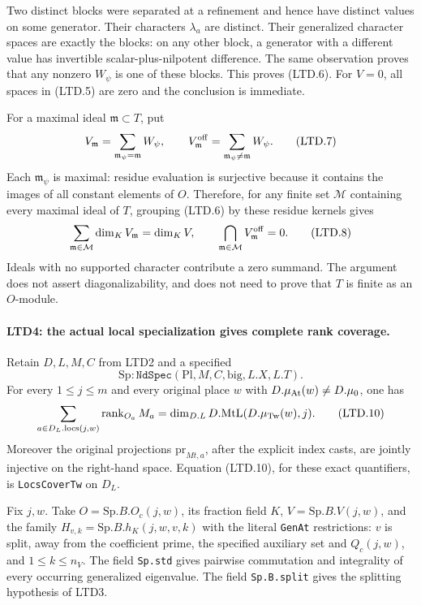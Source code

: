 Two distinct blocks were separated at a refinement and hence
have distinct values on some generator.  Their characters
\(\lambda_a\) are distinct.  Their generalized character spaces
are exactly the blocks: on any other block, a generator with
a different value has invertible scalar-plus-nilpotent difference.
The same observation proves that any nonzero \(W_\psi\) is one
of these blocks.  This proves (LTD.6).  For \(V=0\), all spaces
in (LTD.5) are zero and the conclusion is immediate.

For a maximal ideal \(\mathfrak m\subset T\), put
\[
 V_{\mathfrak m}=\sum_{\mathfrak m_\psi=\mathfrak m}W_\psi,
 \qquad V^{\rm off}_{\mathfrak m}
            =\sum_{\mathfrak m_\psi\ne\mathfrak m}W_\psi.        \tag{LTD.7}
\]
Each \(\mathfrak m_\psi\) is maximal: residue evaluation is
surjective because it contains the images of all constant
elements of \(O\).  Therefore, for any finite set \(\mathcal M\)
containing every maximal ideal of \(T\), grouping (LTD.6) by
these residue kernels gives
\[
 \sum_{\mathfrak m\in\mathcal M}\dim_KV_{\mathfrak m}=\dim_KV,
 \qquad
 \bigcap_{\mathfrak m\in\mathcal M}V^{\rm off}_{\mathfrak m}=0.
 \tag{LTD.8}
\]
Ideals with no supported character contribute a zero summand.
The argument does not assert diagonalizability, and does not
need to prove that \(T\) is finite as an \(O\)-module.

\paragraph{LTD4: the actual local specialization gives complete rank coverage.}
\label{claim:LTD4}
Retain \(D,L,M,C\) from LTD2 and a specified
\[
 \mathrm{Sp}:\texttt{NdSpec}(\mathrm{Pl},M,C,\mathrm{big},L.X,L.T).
 \tag{LTD.9}
\]
For every \(1\le j\le m\) and every original place \(w\) with
\(D.\mu_{\rm At}(w)\ne D.\mu_0\), one has
\[
 \sum_{a\in D_L.\mathrm{locs}(j,w)}
          \operatorname{rank}_{O_a}M_a
       =\dim_{D.L}D.\mathrm{MtL}(D.\mu_{\rm Tw}(w),j).
 \tag{LTD.10}
\]
Moreover the original projections \(\mathrm{pr}_{Mt,a}\), after
the explicit index casts, are jointly injective on the right-hand
space.  Equation (LTD.10), for these exact quantifiers, is
\texttt{LocsCoverTw} on \(D_L\).

Fix \(j,w\).  Take \(O=\mathrm{Sp}.B.O_c(j,w)\), its fraction
field \(K\), \(V=\mathrm{Sp}.B.V(j,w)\), and the family
\(H_{v,k}=\mathrm{Sp}.B.h_K(j,w,v,k)\) with the literal
\texttt{GenAt} restrictions: \(v\) is split, away from the
coefficient prime, the specified auxiliary set and \(Q_c(j,w)\),
and \(1\le k\le n_V\).  The field \texttt{Sp.std} gives
pairwise commutation and integrality of every occurring
generalized eigenvalue.  The field \texttt{Sp.B.split} gives
the splitting hypothesis of LTD3.

